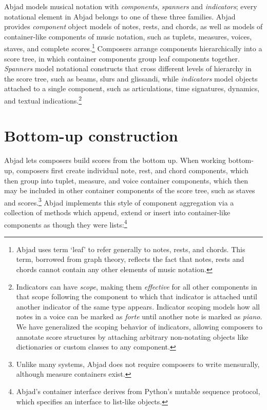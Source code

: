 \documentclass{article}
\begin{document}
Abjad models musical notation with \emph{components}, \emph{spanners} and
\emph{indicators}; every notational element in Abjad belongs to one of these
three families. Abjad provides \emph{component} object models of notes, rests,
and chords, as well as models of container-like components of music notation,
such as tuplets, measures, voices, staves, and complete scores.\footnote{Abjad
uses term `leaf' to refer generally to notes, rests, and chords. This term,
borrowed from graph theory, reflects the fact that notes, rests and chords
cannot contain any other elements of music notation.} Composers arrange
components hierarchically into a score tree, in which container components
group leaf components together. \emph{Spanners} model notational constructs
that cross different levels of hierarchy in the score tree, such as beams,
slurs and glissandi, while \emph{indicators} model objects attached to a single
component, such as articulations, time signatures, dynamics, and textual
indications.\footnote{Indicators can have \emph{scope}, making them
\emph{effective} for all other components in that scope following the component
to which that indicator is attached until another indicator of the same type
appears. Indicator scoping models how all notes in a voice can be marked as
\emph{forte} until another note is marked as \emph{piano}. We have generalized
the scoping behavior of indicators, allowing composers to annotate score
structures by attaching arbitrary non-notating objects like dictionaries or
custom classes to any component.}

\section{Bottom-up construction} \label{sec:bottom-up}

Abjad lets composers build scores from the bottom up. When working bottom-up,
composers first create individual note, rest, and chord components, which then
group into tuplet, measure, and voice container components, which then may be
included in other container components of the score tree, such as staves and
scores.\footnote{Unlike many systems, Abjad does not require composers to write
mensurally, although measure containers exist.}  Abjad implements this style of
component aggregation via a collection of methods which append, extend or
insert into container-like components as though they were
lists:\footnote{Abjad's container interface derives from Python's mutable
sequence protocol, which specifies an interface to list-like objects.}
\end{document}
